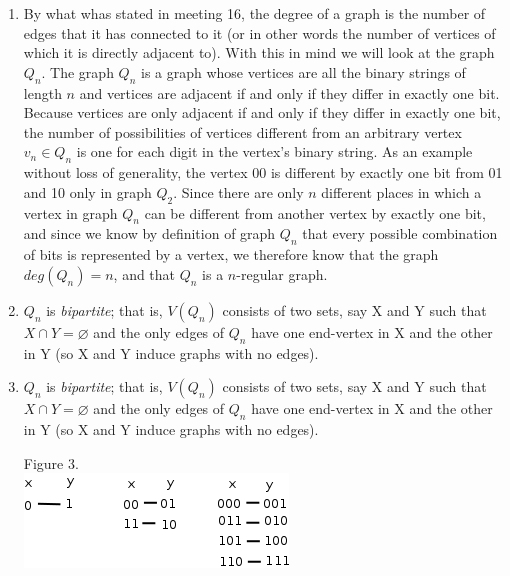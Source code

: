 \documentclass[10pt,a4paper]{report}
\begin{document}
\begin{enumerate}
			\item[] By what whas stated in meeting 16, the degree of a graph is the number of edges that it has connected to it (or in other words the number of vertices of which it is directly adjacent to).  With this in mind we will look at the graph $Q_{n}$.  The graph $Q_{n}$ is a graph whose vertices are all the binary strings of length $n$ and vertices are adjacent if and only if they differ in exactly one bit.  Because vertices are only adjacent if and only if they differ in exactly one bit, the number of possibilities of vertices different from an arbitrary vertex $v_{n}\in Q_{n}$ is one for each digit in the vertex's binary string.  As an example without loss of generality, the vertex 00 is different by exactly one bit from 01 and 10 only in graph $Q_{2}$.  Since there are only $n$ different places in which a vertex in graph $Q_{n}$ can be different from another vertex by exactly one bit, and since we know by definition of graph $Q_{n}$ that every possible combination of bits is represented by a vertex, we therefore know that the graph $deg(Q_{n})=n$, and that $Q_{n}$ is a $n$-regular graph.
			
			\item $Q_n$ is \textit{bipartite}; that is, $V(Q_n)$ consists of two sets, say X and Y such that $X\cap Y = \varnothing$ and the only edges of $Q_n$ have one end-vertex in X and the other in Y (so X and Y induce graphs with no edges).
			
			\item $Q_n$ is \textit{bipartite}; that is, $V(Q_n)$ consists of two sets, say X and Y such that $X\cap Y = \varnothing$ and the only edges of $Q_n$ have one end-vertex in X and the other in Y (so X and Y induce graphs with no edges).\\
			\begin{center}
				Figure 3.\\
				\includegraphics[scale=.5]{2_3.png}
			\end{center}
			

\end{enumerate}
\end{document}
